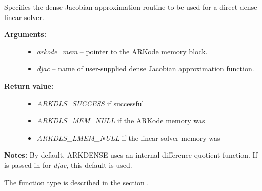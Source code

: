 \documentclass[letterpaper,10pt,english]{sphinxmanual}
\begin{document}
\begin{fulllineitems}
\label{c_interface/User_callable:c.ARKDlsSetDenseJacFn}
Specifies the dense Jacobian approximation routine to
be used for a direct dense linear solver.
\begin{description}
\item[{\textbf{Arguments:}}] \leavevmode\begin{itemize}
\item {} 
\emph{arkode\_mem} -- pointer to the ARKode memory block.

\item {} 
\emph{djac} -- name of user-supplied dense Jacobian approximation function.

\end{itemize}

\item[{\textbf{Return value:}}] \leavevmode\begin{itemize}
\item {} 
\emph{ARKDLS\_SUCCESS}  if successful

\item {} 
\emph{ARKDLS\_MEM\_NULL}  if the ARKode memory was 

\item {} 
\emph{ARKDLS\_LMEM\_NULL} if the linear solver memory was 

\end{itemize}

\end{description}

\textbf{Notes:} By default, ARKDENSE uses an internal difference quotient
function.  If  is passed in for \emph{djac}, this default is used.

The function type {\hyperref[c_interface/User_supplied:c.ARKDlsDenseJacFn]{\emph{}}} is described in the section
{\hyperref[c_interface/User_supplied:cinterface-usersupplied]{\emph{}}}.

\end{fulllineitems}

\end{document}
